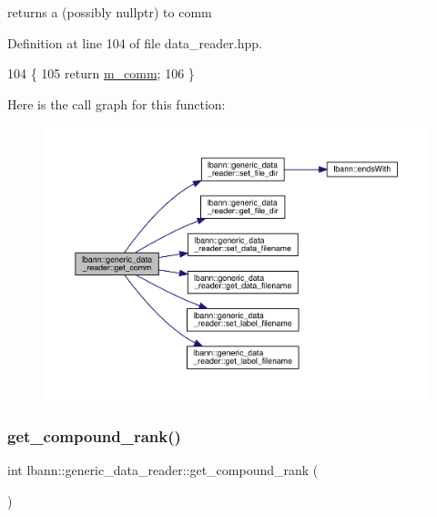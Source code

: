 returns a (possibly nullptr) to comm 



Definition at line 104 of file data\+\_\+reader.\+hpp.


\begin{DoxyCode}
104                                 \{
105     \textcolor{keywordflow}{return} \hyperlink{classlbann_1_1generic__data__reader_ad3976d4b7db2d404dbb87a56c33fd456}{m\_comm};
106   \}
\end{DoxyCode}
Here is the call graph for this function\+:\nopagebreak
\begin{figure}[H]
\begin{center}
\leavevmode
\includegraphics[width=350pt]{classlbann_1_1generic__data__reader_aedca18323a7777180fc12d73d809fb84_cgraph}
\end{center}
\end{figure}
\mbox{\label{classlbann_1_1generic__data__reader_ac4fc0729e7f1240e167fe897df99f950}} 
\subsubsection{\texorpdfstring{get\+\_\+compound\+\_\+rank()}{get\_compound\_rank()}}
{\footnotesize\ttfamily int lbann\+::generic\+\_\+data\+\_\+reader\+::get\+\_\+compound\+\_\+rank (\begin{DoxyParamCaption}{ }\end{DoxyParamCaption})\hspace{0.3cm}{\ttfamily [inline]}}



